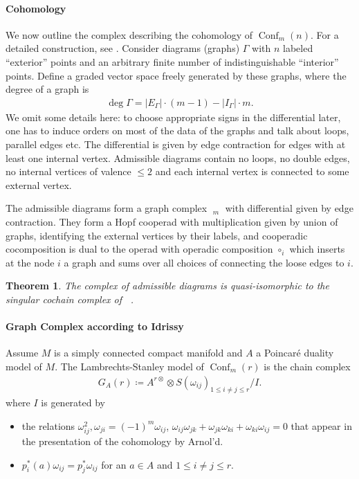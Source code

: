 \documentclass{scrartcl}
\theoremstyle{plain}
\newtheorem{theorem}{Theorem}[section]
\theoremstyle{definition}
\newcommand{\abs}[1]{\left\lvert#1\right\rvert}
\newcommand{\defeq}{\coloneqq}
\DeclareMathOperator{\Conf}{Conf}
\DeclareMathOperator{\cConf}{\overline{Conf}}
\DeclareMathOperator{\coGraphs}{{}^*Graphs}
\newcommand{\comp}{\mathbin{\circ}}
\begin{document}
\paragraph{Cohomology} We now outline the complex describing the cohomology of $\Conf_m(n)$. For a detailed construction, see \cite[Chapter 6]{lambrechts2014formality}. Consider diagrams (graphs) $\Gamma$ with $n$ labeled ``exterior'' points and an arbitrary finite number of indistinguishable ``interior'' points. Define a graded vector space freely generated by these graphs, where the degree of a graph is 
\begin{align*}
    \deg \Gamma = \abs{E_\Gamma} \cdot (m-1) - \abs{I_\Gamma} \cdot m.
\end{align*} 
We omit some details here: to choose appropriate signs in the differential later, one has to induce orders on most of the data of the graphs and talk about loops, parallel edges etc. The differential is given by edge contraction for edges with at least one internal vertex. Admissible diagrams contain no loops, no double edges, no internal vertices of valence $\leq 2$ and each internal vertex is connected to some external vertex. 

The admissible diagrams form a graph complex $\coGraphs_m$ with differential given by edge contraction. They form a Hopf cooperad with multiplication given by union of graphs, identifying the external vertices by their labels, and cooperadic cocomposition is dual to the operad with operadic composition $\comp_i$ which inserts at the node $i$ a graph and sums over all choices of connecting the loose edges to $i$. 

\begin{theorem}
    The complex of admissible diagrams is quasi-isomorphic to the singular cochain complex of $\cConf$.
\end{theorem}

\paragraph{Graph Complex according to Idrissy \cite{idrissi2021real}} Assume $M$ is a simply connected compact manifold and $A$ a Poincaré duality model of $M$. The Lambrechts-Stanley model of $\Conf_m(r)$ is the chain complex 
\begin{align*}
    G_A(r) \defeq A^{r\otimes} \otimes S(\omega_{ij})_{1 \leq i\neq j\leq r} / I.
\end{align*}
where $I$ is generated by 
\begin{itemize}
    \item the relations $\omega_{ij}^2, \omega_{ji} = (-1)^m \omega_{ij}$, $\omega_{ij}\omega_{jk} + \omega_{jk}\omega_{ki} + \omega_{ki}\omega_{ij} = 0$ that appear in the presentation of the cohomology by Arnol'd.
    \item $p_i^*(a)\omega_{ij} = p_j^*\omega_{ij}$ for an $a\in A$ and $1\leq i\neq j \leq r$. 
\end{itemize}
\end{document}
